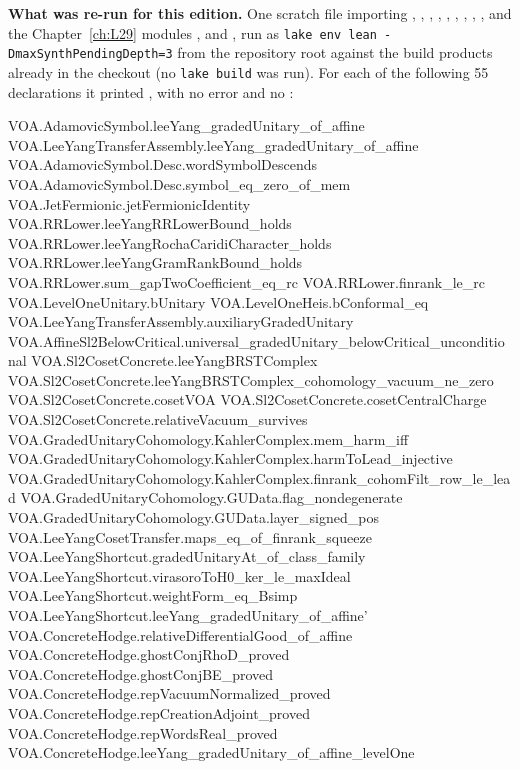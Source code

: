 \textbf{What was re-run for this edition.} One scratch file importing ,
, , , ,
, , , ,
 and the Chapter~\ref{ch:L29} modules ,  and
, run as \texttt{lake env lean -DmaxSynthPendingDepth=3} from the repository root against the build products already
in the checkout (no \texttt{lake build} was run). For each of the following 55 declarations it printed
, with no error and no :
\begin{plaincode}
VOA.AdamovicSymbol.leeYang_gradedUnitary_of_affine
VOA.LeeYangTransferAssembly.leeYang_gradedUnitary_of_affine
VOA.AdamovicSymbol.Desc.wordSymbolDescends
VOA.AdamovicSymbol.Desc.symbol_eq_zero_of_mem
VOA.JetFermionic.jetFermionicIdentity
VOA.RRLower.leeYangRRLowerBound_holds
VOA.RRLower.leeYangRochaCaridiCharacter_holds
VOA.RRLower.leeYangGramRankBound_holds
VOA.RRLower.sum_gapTwoCoefficient_eq_rc
VOA.RRLower.finrank_le_rc
VOA.LevelOneUnitary.bUnitary
VOA.LevelOneHeis.bConformal_eq
VOA.LeeYangTransferAssembly.auxiliaryGradedUnitary
VOA.AffineSl2BelowCritical.universal_gradedUnitary_belowCritical_unconditional
VOA.Sl2CosetConcrete.leeYangBRSTComplex
VOA.Sl2CosetConcrete.leeYangBRSTComplex_cohomology_vacuum_ne_zero
VOA.Sl2CosetConcrete.cosetVOA
VOA.Sl2CosetConcrete.cosetCentralCharge
VOA.Sl2CosetConcrete.relativeVacuum_survives
VOA.GradedUnitaryCohomology.KahlerComplex.mem_harm_iff
VOA.GradedUnitaryCohomology.KahlerComplex.harmToLead_injective
VOA.GradedUnitaryCohomology.KahlerComplex.finrank_cohomFilt_row_le_lead
VOA.GradedUnitaryCohomology.GUData.flag_nondegenerate
VOA.GradedUnitaryCohomology.GUData.layer_signed_pos
VOA.LeeYangCosetTransfer.maps_eq_of_finrank_squeeze
VOA.LeeYangShortcut.gradedUnitaryAt_of_class_family
VOA.LeeYangShortcut.virasoroToH0_ker_le_maxIdeal
VOA.LeeYangShortcut.weightForm_eq_Bsimp
VOA.LeeYangShortcut.leeYang_gradedUnitary_of_affine'
VOA.ConcreteHodge.relativeDifferentialGood_of_affine
VOA.ConcreteHodge.ghostConjRhoD_proved
VOA.ConcreteHodge.ghostConjBE_proved
VOA.ConcreteHodge.repVacuumNormalized_proved
VOA.ConcreteHodge.repCreationAdjoint_proved
VOA.ConcreteHodge.repWordsReal_proved
VOA.ConcreteHodge.leeYang_gradedUnitary_of_affine_levelOne

\end{plaincode}
